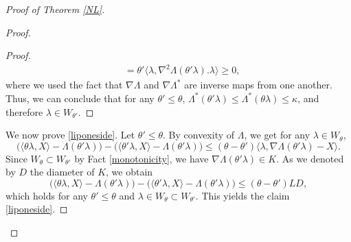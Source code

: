 \documentclass[aop,preprint]{imsart}
\numberwithin{equation}{section}
\theoremstyle{definition}
\theoremstyle{plain}
\theoremstyle{remark}
\begin{document}
\begin{proof}[Proof of Theorem \ref{NL}]
\begin{proof}
\begin{proof}
\begin{align*}
& = \theta' \langle \lambda , \nabla^2\Lambda(\theta' \lambda). \lambda \rangle \geq 0,
\end{align*}
 where we used the fact that $\nabla \Lambda$ and  $\nabla \Lambda^*$ are inverse maps from one another. Thus, we can conclude that for any $\theta'\leq \theta$, $\Lambda^*(\theta' \lambda)\leq \Lambda^*(\theta \lambda)\leq \kappa $, and therefore $\lambda \in W_{\theta'}$.
\end{proof}
We now prove \eqref{liponeside}. Let $\theta' \leq \theta$. By convexity of $\Lambda$, we get for any $\lambda \in W_{\theta}$,
$$
\big( \langle \theta \lambda, X\rangle   -\Lambda(\theta' \lambda)\big) - \big ( \langle \theta' \lambda, X\rangle   -\Lambda(\theta' \lambda)\big)  \leq (\theta-\theta')\langle \lambda, \nabla \Lambda(\theta' \lambda) -X\rangle.$$
Since  $ W_{\theta}\subset W_{\theta'}$ by Fact \ref{monotonicity}, we have  $\nabla \Lambda (\theta'\lambda) \in K$. As we denoted by $D$ the diameter of $K$, we obtain
$$
\big( \langle \theta \lambda, X\rangle   -\Lambda(\theta' \lambda)\big) - \big ( \langle \theta' \lambda, X\rangle   -\Lambda(\theta' \lambda)\big)  \leq (\theta -\theta') L D,
$$
which holds for any $\theta'\leq \theta$ and $\lambda \in W_\theta\subset W_{\theta'}$. This yields the claim \eqref{liponeside}. 


\end{proof}
\end{proof}
\end{document}
